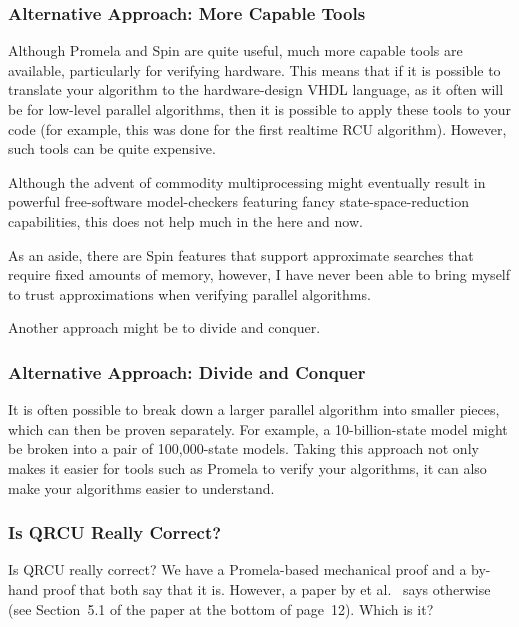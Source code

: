 \subsubsection{Alternative Approach:
				     More Capable Tools}
\label{sec:formal:Alternative Approach: More Capable Tools}

Although Promela and Spin are quite useful,
much more capable tools are available, particularly for verifying
hardware.
This means that if it is possible to translate your algorithm
to the hardware-design VHDL language, as it often will be for
low-level parallel algorithms, then it is possible to apply these
tools to your code (for example, this was done for the first
realtime RCU algorithm).
However, such tools can be quite expensive.

Although the advent of commodity multiprocessing
might eventually result in powerful free-software model-checkers
featuring fancy state-space-reduction capabilities,
this does not help much in the here and now.

As an aside, there are Spin features that support approximate searches
that require fixed amounts of memory, however, I have never been able
to bring myself to trust approximations when verifying parallel
algorithms.

Another approach might be to divide and conquer.

\subsubsection{Alternative Approach:
				     Divide and Conquer}
\label{sec:formal:Alternative Approach: Divide and Conquer}

It is often possible to break down a larger parallel algorithm into
smaller pieces, which can then be proven separately.
For example, a 10-billion-state model might be broken into a pair
of 100,000-state models.
Taking this approach not only makes it easier for tools such as
Promela to verify your algorithms, it can also make your algorithms
easier to understand.

\subsubsection{Is QRCU Really Correct?}
\label{sec:formal:Is QRCU Really Correct?}

Is QRCU really correct?
We have a Promela-based mechanical proof and a by-hand proof that both
say that it is.
However, a paper by  et al.~\cite{JadeAlglave2013-cav}
says otherwise (see Section~5.1 of the paper at the bottom of page~12).
Which is it?

